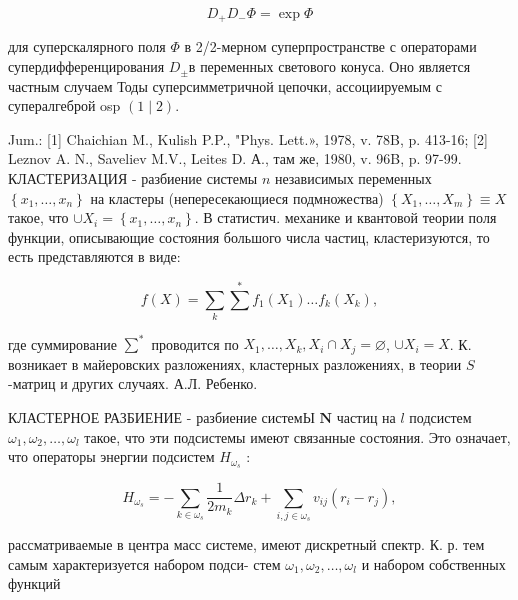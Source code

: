 \documentclass[10pt]{article}
\begin{document}
\[

D_{+} D_{-} \Phi=\exp \Phi

\]



для суперскалярного поля $\Phi$ в 2/2-мерном суперпространстве с операторами супердифференцирования $D_{ \pm}$в переменных светового конуса. Оно является частным случаем Тоды суперсимметричной цепочки, ассоциируемым с супералгеброй osp $(1 \mid 2)$.



Jum.: [1] Chaichian M., Kulish P.P., "Phys. Lett.», 1978, v. 78B, p. 413-16; [2] Leznov A. N., Saveliev M.V., Leites D. А., там же, 1980, v. 96B, p. 97-99. КЛАСТЕРИЗАЦИЯ - разбиение системы $n$ независимых переменных $\left\{x_{1}, \ldots, x_{n}\right\}$ на кластеры (непересекающиеся подмножества) $\left\{X_{1}, \ldots, X_{m}\right\} \equiv X$ такое, что $\cup X_{i}=\left\{x_{1}, \ldots, x_{n}\right\}$. В статистич. механике и квантовой теории поля функции, описывающие состояния большого числа частиц, кластеризуются, то есть представляются в виде:



\[

f(X)=\sum_{k} \sum^{*} f_{1}\left(X_{1}\right) \ldots f_{k}\left(X_{k}\right),

\]



где суммирование $\sum^{*}$ проводится по $X_{1}, \ldots, X_{k}, X_{i} \cap X_{j}=\varnothing$, $\cup X_{i}=X$. К. возникает в майеровских разложениях, кластерных разложениях, в теории $S$-матриц и других случаях. А.Л. Ребенко.



КЛАСТЕРНОЕ РАЗБИЕНИЕ - разбиение системЫ $\boldsymbol{N}$ частиц на $l$ подсистем $\omega_{1}, \omega_{2}, \ldots, \omega_{l}$ такое, что эти подсистемы имеют связанные состояния. Это означает, что операторы энергии подсистем $H_{\omega_{s}}$ :



\[

H_{\omega_{s}}=-\sum_{k \in \omega_{s}} \frac{1}{2 m_{k}} \Delta r_{k}+\sum_{i, j \in \omega_{s}} v_{i j}\left(r_{i}-r_{j}\right),

\]



рассматриваемые в центра масс системе, имеют дискретный спектр. К. р. тем самым характеризуется набором подси- стем $\omega_{1}, \omega_{2}, \ldots, \omega_{l}$ и набором собственных функций
\end{document}
